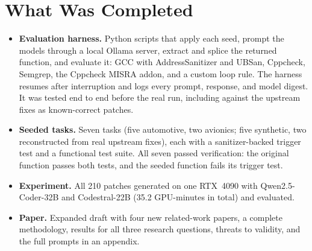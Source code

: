 \documentclass[12pt]{article}
\begin{document}
\section{What Was Completed}
\begin{itemize}[leftmargin=*]
    \item \textbf{Evaluation harness.} Python scripts that apply each seed, prompt the models through a local Ollama server, extract and splice the returned function, and evaluate it: GCC with AddressSanitizer and UBSan, Cppcheck, Semgrep, the Cppcheck MISRA addon, and a custom loop rule. The harness resumes after interruption and logs every prompt, response, and model digest. It was tested end to end before the real run, including against the upstream fixes as known-correct patches.
    \item \textbf{Seeded tasks.} Seven tasks (five automotive, two avionics; five synthetic, two reconstructed from real upstream fixes), each with a sanitizer-backed trigger test and a functional test suite. All seven passed verification: the original function passes both tests, and the seeded function fails its trigger test.
    \item \textbf{Experiment.} All 210 patches generated on one RTX~4090 with Qwen2.5-Coder-32B and Codestral-22B (35.2 GPU-minutes in total) and evaluated.
    \item \textbf{Paper.} Expanded draft with four new related-work papers, a complete methodology, results for all three research questions, threats to validity, and the full prompts in an appendix.
\end{itemize}
\end{document}
